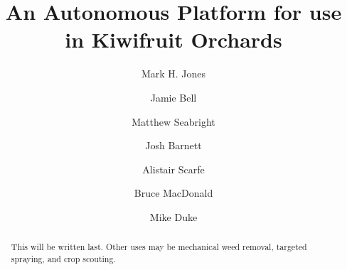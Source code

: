 \documentclass[preprint,authoryear,12pt]{elsarticle}
\begin{document}
\begin{frontmatter}



\title{An Autonomous Platform for use in Kiwifruit Orchards}



\author[UoW]{Mark H. Jones} 

\author[UoA]{Jamie Bell}
\author[UoW]{Matthew Seabright}
\author[UoW]{Josh Barnett}
\author[RPL]{Alistair Scarfe}
\author[UoA]{Bruce MacDonald}
\author[UoW]{Mike Duke}

\address[UoW]{School of Engineering, University of Waikato, Hamilton, New Zealand}
\address[UoA]{Faculty of Engineering, University of Auckland, Auckland, New Zealand}
\address[RPL]{Robotics Plus Ltd, Newnham Innovation Park, Tauranga, New Zealand}

\begin{abstract}

    This will be written last.
    Other uses may be mechanical weed removal, targeted spraying, and crop scouting.
\end{abstract}

\begin{keyword}


\end{keyword}

\end{frontmatter}
\end{document}
